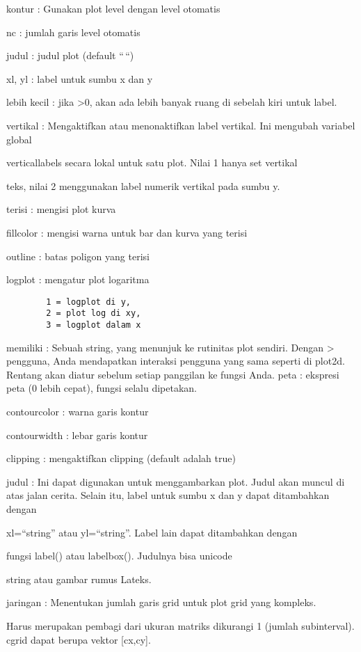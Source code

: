 \documentclass[
]{book}
\begin{document}
kontur : Gunakan plot level dengan level otomatis

nc : jumlah garis level otomatis

judul : judul plot (default ``\,``)

xl, yl : label untuk sumbu x dan y

lebih kecil : jika \textgreater0, akan ada lebih banyak ruang di sebelah kiri untuk label.

vertikal : Mengaktifkan atau menonaktifkan label vertikal. Ini mengubah variabel global

verticallabels secara lokal untuk satu plot. Nilai 1 hanya set vertikal

teks, nilai 2 menggunakan label numerik vertikal pada sumbu y.

terisi : mengisi plot kurva

fillcolor : mengisi warna untuk bar dan kurva yang terisi

outline : batas poligon yang terisi

logplot : mengatur plot logaritma

\begin{verbatim}
        1 = logplot di y,
        2 = plot log di xy,
        3 = logplot dalam x
\end{verbatim}

memiliki : Sebuah string, yang menunjuk ke rutinitas plot sendiri. Dengan \textgreater{} pengguna, Anda mendapatkan interaksi pengguna yang sama seperti di plot2d. Rentang akan diatur sebelum setiap panggilan ke fungsi Anda. peta : ekspresi peta (0 lebih cepat), fungsi selalu dipetakan.

contourcolor : warna garis kontur

contourwidth : lebar garis kontur

clipping : mengaktifkan clipping (default adalah true)

judul : Ini dapat digunakan untuk menggambarkan plot. Judul akan muncul di atas jalan cerita. Selain itu, label untuk sumbu x dan y dapat ditambahkan dengan

xl=``string'' atau yl=``string''. Label lain dapat ditambahkan dengan

fungsi label() atau labelbox(). Judulnya bisa unicode

string atau gambar rumus Lateks.

jaringan : Menentukan jumlah garis grid untuk plot grid yang kompleks.

Harus merupakan pembagi dari ukuran matriks dikurangi 1 (jumlah subinterval). cgrid dapat berupa vektor {[}cx,cy{]}.
\end{document}
